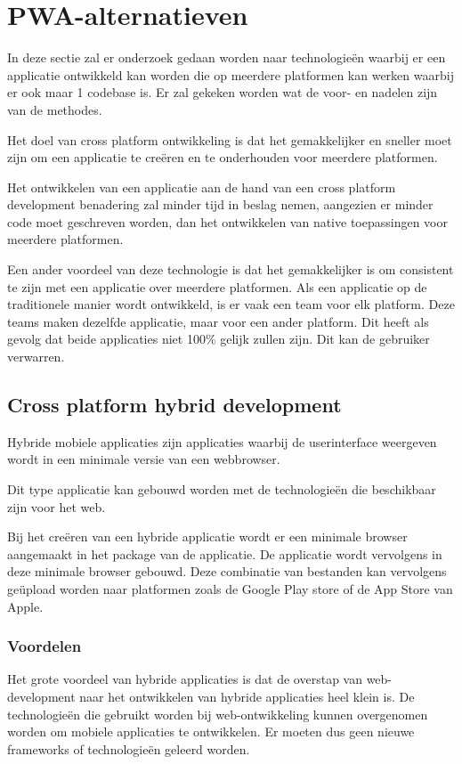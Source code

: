 \section{PWA-alternatieven}

In deze sectie zal er onderzoek gedaan worden naar technologieën waarbij er een applicatie ontwikkeld kan worden die op meerdere platformen kan werken waarbij er ook maar 1 codebase is. Er zal gekeken worden wat de voor- en nadelen zijn van de methodes. 

Het doel van cross platform ontwikkeling is dat het gemakkelijker en sneller moet zijn om een applicatie te creëren en te onderhouden voor meerdere platformen.

Het ontwikkelen van een applicatie aan de hand van een cross platform development benadering zal minder tijd in beslag nemen, aangezien er minder code moet geschreven worden, dan het ontwikkelen van native toepassingen voor meerdere platformen. 

Een ander voordeel van deze technologie is dat het gemakkelijker is om consistent te zijn met een applicatie over meerdere platformen. Als een applicatie op de traditionele manier wordt ontwikkeld, is er vaak een team voor elk platform. Deze teams maken dezelfde applicatie, maar voor een ander platform. Dit heeft als gevolg dat beide applicaties niet 100\% gelijk zullen zijn. Dit kan de gebruiker verwarren.


\subsection{Cross platform hybrid development}

	Hybride mobiele applicaties zijn applicaties waarbij de userinterface weergeven wordt in een minimale versie van een webbrowser.
		
	Dit type applicatie kan gebouwd worden met de technologieën die beschikbaar zijn voor het web.
	
	Bij het creëren van een hybride applicatie wordt er een minimale browser aangemaakt in het package van de applicatie. De applicatie wordt vervolgens in deze minimale browser gebouwd. Deze combinatie van bestanden kan vervolgens geüpload worden naar platformen zoals de Google Play store of de App Store van Apple.
	
	\autocite{Huynh2017}
	
	
	\subsubsection{Voordelen}
		Het grote voordeel van hybride applicaties is dat de overstap van web-development naar het ontwikkelen van hybride applicaties heel klein is. De technologieën die gebruikt worden bij web-ontwikkeling kunnen overgenomen worden om mobiele applicaties te ontwikkelen. Er moeten dus geen nieuwe frameworks of technologieën geleerd worden.
		
